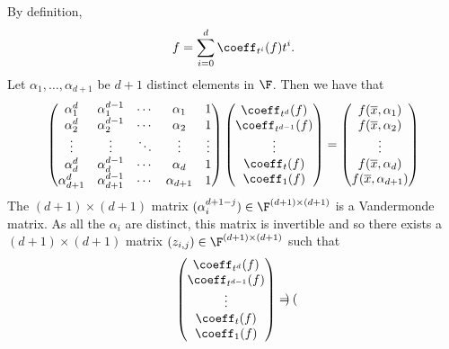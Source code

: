\documentclass[letterpaper, 11pt]{amsart}
\begin{document}
\begin{pf}
    By definition,
    \[
        f = \sum_{i = 0}^d \coeff_{t^i}(f) t^i.
    \]
    Let $\alpha_1, \ldots, \alpha_{d + 1}$ be $d + 1$ distinct elements in $\F$.
    Then we have that 
    \[
        \begin{pmatrix}
            \alpha_1^d & \alpha_1^{d - 1} & \cdots & \alpha_1 & 1 \\ 
            \alpha_2^d & \alpha_2^{d - 1} & \cdots & \alpha_2 & 1 \\ 
            \vdots & \vdots & \ddots & \vdots & \vdots \\
            \alpha_{d}^d & \alpha_{d}^{d - 1} & \cdots & \alpha_{d} & 1 \\ 
            \alpha_{d + 1}^d & \alpha_{d + 1}^{d - 1} & \cdots & \alpha_{d + 1} & 1 
        \end{pmatrix}
        \begin{pmatrix}
            \coeff_{t^d}(f) \\
            \coeff_{t^{d-1}}(f) \\
            \vdots \\
            \coeff_{t}(f) \\
            \coeff_{1}(f)
        \end{pmatrix}
        =
        \begin{pmatrix}
            f(\overline{x},\alpha_1) \\
            f(\overline{x},\alpha_2) \\
            \vdots \\
            f(\overline{x},\alpha_d) \\
            f(\overline{x},\alpha_{d+1})
        \end{pmatrix}        
    \]
    The $(d + 1) \times (d + 1)$ matrix $(\alpha_i^{d + 1 - j}) \in \F^{(d + 1) \times (d + 1)}$ is a Vandermonde matrix.
    As all the $\alpha_i$ are distinct, this matrix is invertible and so there exists a $(d + 1) \times (d + 1)$ matrix $(z_{i, j}) \in \F^{(d + 1) \times (d + 1)}$ such that
    \[
        \begin{pmatrix}
            \coeff_{t^d}(f) \\
            \coeff_{t^{d-1}}(f) \\
            \vdots \\
            \coeff_{t}(f) \\
            \coeff_{1}(f)
        \end{pmatrix}
        =
        \begin{pmatrix}

\end{pmatrix}\]
\end{pf}
\end{document}
